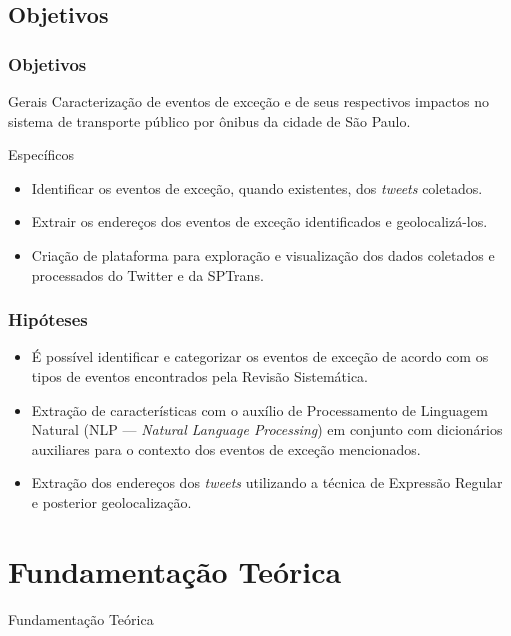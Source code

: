 \documentclass{beamer}
\begin{document}
\subsection{Objetivos}
\begin{frame}
\frametitle{Objetivos}
\begin{block}{Gerais}
Caracterização de eventos de exceção e de seus respectivos impactos no sistema de transporte público por ônibus da cidade de São Paulo.
\end{block}
\begin{block}{Específicos}
\begin{itemize}
    \item Identificar os eventos de exceção, quando existentes, dos \textit{tweets} coletados.
     \item Extrair os endereços dos eventos de exceção identificados e geolocalizá-los.
\item Criação de plataforma para exploração e visualização dos dados coletados e processados do Twitter e da SPTrans.
\end{itemize}
\end{block}
\end{frame}
\begin{frame}
\frametitle{Hipóteses}

\begin{itemize}

\item É possível identificar e categorizar os eventos de exceção de acordo com os tipos de eventos encontrados pela Revisão Sistemática.

\item Extração de características com o auxílio de Processamento de Linguagem Natural (NLP --- \textit{Natural Language Processing}) em conjunto com dicionários auxiliares para o contexto dos eventos de exceção mencionados.

\item Extração dos endereços dos \textit{tweets} utilizando a técnica de Expressão Regular e posterior geolocalização.
\end{itemize}

\end{frame}
\section{Fundamentação Teórica}
\begin{frame}
\Huge{\centerline{Fundamentação Teórica}}
\end{frame}
\end{document}

